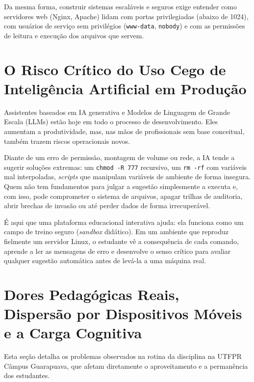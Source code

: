 Da mesma forma, construir sistemas escaláveis e seguros exige entender como servidores web (Nginx, Apache) lidam com portas privilegiadas (abaixo de 1024), com usuários de serviço sem privilégios (\texttt{www-data}, \texttt{nobody}) e com as permissões de leitura e execução dos arquivos que servem.

\section{O Risco Crítico do Uso Cego de Inteligência Artificial em Produção}
\label{sec:risco-ia}

Assistentes baseados em IA generativa e Modelos de Linguagem de Grande Escala (LLMs) estão hoje em todo o processo de desenvolvimento. Eles aumentam a produtividade, mas, nas mãos de profissionais sem base conceitual, também trazem riscos operacionais novos.

Diante de um erro de permissão, montagem de volume ou rede, a IA tende a sugerir soluções extremas: um \texttt{chmod -R 777} recursivo, um \texttt{rm -rf} com variáveis mal interpoladas, \textit{scripts} que manipulam variáveis de ambiente de forma insegura. Quem não tem fundamentos para julgar a sugestão simplesmente a executa e, com isso, pode comprometer o sistema de arquivos, apagar trilhas de auditoria, abrir brechas de invasão ou até perder dados de forma irrecuperável.

É aqui que uma plataforma educacional interativa ajuda: ela funciona como um campo de treino seguro (\textit{sandbox} didático). Em um ambiente que reproduz fielmente um servidor Linux, o estudante vê a consequência de cada comando, aprende a ler as mensagens de erro e desenvolve o senso crítico para avaliar qualquer sugestão automática antes de levá-la a uma máquina real.

\section{Dores Pedagógicas Reais, Dispersão por Dispositivos Móveis e a Carga Cognitiva}
\label{sec:dores-pedagogicas}

Esta seção detalha os problemas observados na rotina da disciplina na UTFPR Câmpus Guarapuava, que afetam diretamente o aproveitamento e a permanência dos estudantes.

